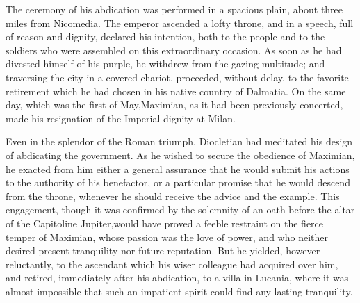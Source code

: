 The ceremony of his abdication was performed in a spacious plain,
about three miles from Nicomedia. The emperor ascended a lofty
throne, and in a speech, full of reason and dignity, declared his
intention, both to the people and to the soldiers who were
assembled on this extraordinary occasion. As soon as he had
divested himself of his purple, he withdrew from the gazing
multitude; and traversing the city in a covered chariot,
proceeded, without delay, to the favorite retirement which he had
chosen in his native country of Dalmatia. On the same day, which
was the first of May,\footnotemark[109] Maximian, as it had been previously
concerted, made his resignation of the Imperial dignity at Milan.

Even in the splendor of the Roman triumph, Diocletian had
meditated his design of abdicating the government. As he wished
to secure the obedience of Maximian, he exacted from him either a
general assurance that he would submit his actions to the
authority of his benefactor, or a particular promise that he
would descend from the throne, whenever he should receive the
advice and the example. This engagement, though it was confirmed
by the solemnity of an oath before the altar of the Capitoline
Jupiter,\footnotemark[110] would have proved a feeble restraint on the fierce
temper of Maximian, whose passion was the love of power, and who
neither desired present tranquility nor future reputation. But he
yielded, however reluctantly, to the ascendant which his wiser
colleague had acquired over him, and retired, immediately after
his abdication, to a villa in Lucania, where it was almost
impossible that such an impatient spirit could find any lasting
tranquility.



